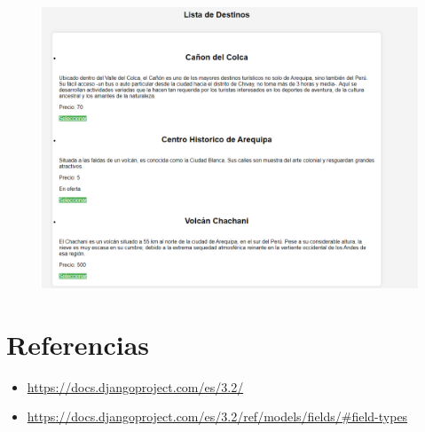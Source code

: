 \documentclass{article}
\begin{document}
	\begin{figure}[H]
		\centering
		\includegraphics[width=1.0\textwidth,keepaspectratio]{img/Vista4.png}
	\end{figure}
\section{Referencias}
\begin{itemize}			
	\item \url{https://docs.djangoproject.com/es/3.2/}
	\item\url{https://docs.djangoproject.com/es/3.2/ref/models/fields/#field-types}
\end{itemize}	
	
%
%
%
			
\end{document}
